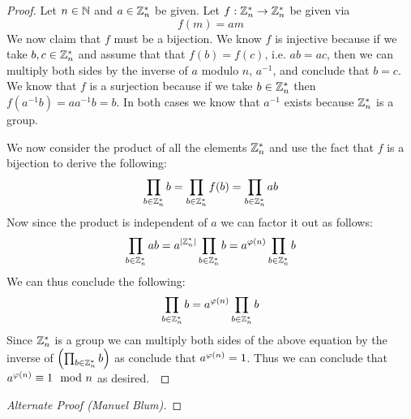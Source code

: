         \begin{proof}
            Let $n \in \mathbb{N}$ and $a \in \mathbb{Z}_{n}^{*}$ be given. Let $f: \mathbb{Z}_{n}^{*} \rightarrow \mathbb{Z}_{n}^{*}$
            be given via 
            \[
                f(m) = am
            \]
            We now claim that $f$ must be a bijection. We know $f$ is injective because if we take
            $b, c \in \mathbb{Z}_{n}^{*}$ and assume that that $f(b) = f(c)$, i.e. $ab = ac$, then we can
            multiply both sides by the inverse of $a$ modulo $n$, $a^{-1}$, and conclude that $b = c$. We know
            that $f$ is a surjection because if we take $b \in \mathbb{Z}_{n}^{*}$ then 
            $f(a^{-1}b) = aa^{-1}b = b$. In both cases we know that $a^{-1}$ exists because $\mathbb{Z}_{n}^{*}$
            is a group.

            We now consider the product of all the elements $\mathbb{Z}_{n}^{*}$ and use the fact that $f$
            is a bijection to derive the following:
            \[
                \prod_{b \in \mathbb{Z}_{n}^{*}} b = \prod_{b \in \mathbb{Z}_{n}^{*}} f(b) = \prod_{b \in \mathbb{Z}_{n}^{*}} ab
            \]
            Now since the product is independent of $a$ we can factor it out as follows:
            \[
                \prod_{b \in \mathbb{Z}_{n}^{*}} ab = a^{|\mathbb{Z}_{n}^{*}|} \prod_{b \in \mathbb{Z}_{n}^{*}} b
                                           = a^{\varphi\left(n\right)} \prod_{b \in \mathbb{Z}_{n}^{*}} b
            \]
            We can thus conclude the following:
            \[
                \prod_{b \in \mathbb{Z}_{n}^{*}} b = a^{\varphi\left(n\right)} \prod_{b \in \mathbb{Z}_{n}^{*}} b
            \]
            Since $\mathbb{Z}_{n}^{*}$ is a group we can multiply both sides of the above equation
            by the inverse of $\left(\prod_{b \in \mathbb{Z}_{n}^{*}} b\right)$ as conclude that $a^{\varphi\left(n\right)} = 1$.
            Thus we can conclude that $a^{\varphi\left(n\right)} \equiv 1 \mod n$ as desired.~\QED
        \end{proof}
        \begin{proof}[Alternate Proof (Manuel Blum)]
        \end{proof}
